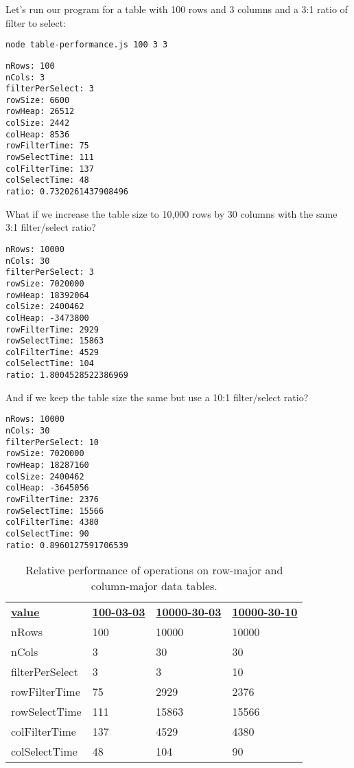 \documentclass[krantzl]{krantz}
\begin{document}
Let's run our program for a table with 100 rows and 3 columns and a 3:1 ratio of filter to select:


\begin{lstlisting}[frame=single,frameround=tttt]
node table-performance.js 100 3 3
\end{lstlisting}



\begin{lstlisting}[frame=single,frameround=tttt]
nRows: 100
nCols: 3
filterPerSelect: 3
rowSize: 6600
rowHeap: 26512
colSize: 2442
colHeap: 8536
rowFilterTime: 75
rowSelectTime: 111
colFilterTime: 137
colSelectTime: 48
ratio: 0.7320261437908496
\end{lstlisting}



\noindent What if we increase the table size to 10,000 rows by 30 columns with the same 3:1 filter/select ratio?


\begin{lstlisting}[frame=single,frameround=tttt]
nRows: 10000
nCols: 30
filterPerSelect: 3
rowSize: 7020000
rowHeap: 18392064
colSize: 2400462
colHeap: -3473800
rowFilterTime: 2929
rowSelectTime: 15863
colFilterTime: 4529
colSelectTime: 104
ratio: 1.8004528522386969
\end{lstlisting}



\noindent And if we keep the table size the same but use a 10:1 filter/select ratio?


\begin{lstlisting}[frame=single,frameround=tttt]
nRows: 10000
nCols: 30
filterPerSelect: 10
rowSize: 7020000
rowHeap: 18287160
colSize: 2400462
colHeap: -3645056
rowFilterTime: 2376
rowSelectTime: 15566
colFilterTime: 4380
colSelectTime: 90
ratio: 0.8960127591706539
\end{lstlisting}


\begin{table}
\begin{tabular}{llll}
\textbf{\underline{value}} & \textbf{\underline{100-03-03}} & \textbf{\underline{10000-30-03}} & \textbf{\underline{10000-30-10}} \\
nRows & 100 & 10000 & 10000 \\
nCols & 3 & 30 & 30 \\
filterPerSelect & 3 & 3 & 10 \\
rowFilterTime & 75 & 2929 & 2376 \\
rowSelectTime & 111 & 15863 & 15566 \\
colFilterTime & 137 & 4529 & 4380 \\
colSelectTime & 48 & 104 & 90 \\
\end{tabular}
\caption{Relative performance of operations on row-major and column-major data tables.}
\label{data-table-performance}
\end{table}
\end{document}
